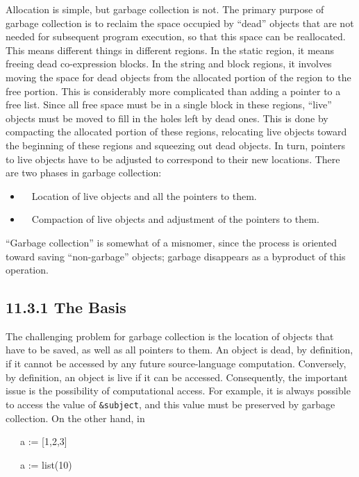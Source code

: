 Allocation is simple, but garbage collection is not. The primary
purpose of garbage collection is to reclaim the space occupied by
``dead'' objects that are not needed for subsequent program execution,
so that this space can be reallocated. This means different things in
different regions. In the static region, it means freeing dead
co-expression blocks. In the string and block regions, it involves
moving the space for dead objects from the allocated portion of the
region to the free portion. This is considerably more complicated than
adding a pointer to a free list. Since all free space must be in a
single block in these regions, ``live'' objects must be moved to fill
in the holes left by dead ones. This is done by compacting the
allocated portion of these regions, relocating live objects toward the
beginning of these regions and squeezing out dead objects. In turn,
pointers to live objects have to be adjusted to correspond to their
new locations. There are two phases in garbage collection:

\liststyleLxii
\begin{itemize}
\item 
\ \ Location of live objects and all the pointers to them.
\item 
\ \ Compaction of live objects and adjustment of the pointers to them.
\end{itemize}

``Garbage collection'' is somewhat of a misnomer, since the process is
oriented toward saving ``non-garbage'' objects; garbage disappears as
a byproduct of this operation.

\subsection[11.3.1 The Basis]{11.3.1 The Basis}

The challenging problem for garbage collection is the location of
objects that have to be saved, as well as all pointers to them. An
object is dead, by definition, if it cannot be accessed by any future
source-language computation.  Conversely, by definition, an object is
live if it can be accessed. Consequently, the important issue is the
possibility of computational access. For example, it is always
possible to access the value of \texttt{\&subject}, and this value
must be preserved by garbage collection. On the other hand, in

{\ttfamily\mdseries
\ \ \ a := [1,2,3]}

{\ttfamily\mdseries
\ \ \ a := list(10)}

